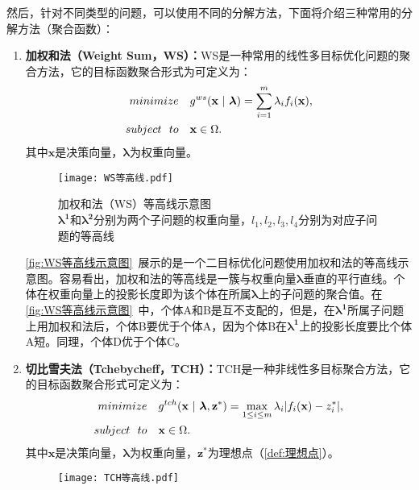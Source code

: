 然后，针对不同类型的问题，可以使用不同的分解方法，下面将介绍三种常用的分解方法（聚合函数）：
\par
\begin{enumerate}
    \item \textbf{加权和法（Weight Sum，WS）：}WS是一种常用的线性多目标优化问题的聚合方法\cite{hillermeier2001nonlinear}，它的目标函数聚合形式为可定义为：
    \begin{align}
        \label{eq:WS}
        minimize \quad & g^{ws}(\mathbf{x} \ | \ \boldsymbol{\lambda}) = \sum_{i=1}^m \lambda_i f_i(\mathbf{x}), \\
        subject \ \ to \quad & \mathbf{x} \in \Omega. \notag
    \end{align}
    其中$\mathbf{x}$是决策向量，$\boldsymbol{\lambda}$为权重向量。
    \begin{figure}[htb]
        \texttt{[image: WS等高线.pdf]}
        \caption[加权和法（WS）等高线示意图]{加权和法（WS）等高线示意图 \\ $\boldsymbol{\lambda^1}$和$\boldsymbol{\lambda^2}$分别为两个子问题的权重向量，$l_1, l_2, l_3, l_4$分别为对应子问题的等高线}
        \label{fig:WS等高线示意图}
    \end{figure}
    \par
    \autoref{fig:WS等高线示意图}~展示的是一个二目标优化问题使用加权和法的等高线示意图。容易看出，加权和法的等高线是一簇与权重向量$\boldsymbol{\lambda}$垂直的平行直线。个体在权重向量上的投影长度即为该个体在所属$\boldsymbol{\lambda}$上的子问题的聚合值。在\autoref{fig:WS等高线示意图}~中，个体A和B是互不支配的，但是，在$\boldsymbol{\lambda^1}$所属子问题上用加权和法后，个体B要优于个体A，因为个体B在$\boldsymbol{\lambda^1}$上的投影长度要比个体A短。同理，个体D优于个体C。
    \item \textbf{切比雪夫法（Tchebycheff，TCH）：}TCH是一种非线性多目标聚合方法\cite{jaszkiewicz2002performance}，它的目标函数聚合形式可定义为：
    \begin{align}
        \label{eq:TCH}
        minimize \quad & g^{tch}(\mathbf{x} \ | \ \boldsymbol{\lambda},\mathbf{z}^*) = \max_{1 \leq i \leq m} \lambda_i | f_i(\mathbf{x}) - z^*_i |, \\
        subject \ \ to \quad & \mathbf{x} \in \Omega. \notag
    \end{align}
    其中$\mathbf{x}$是决策向量，$\boldsymbol{\lambda}$为权重向量，$\mathbf{z}^*$为理想点（\autoref{def:理想点}）。
    \par
    \begin{figure}[htb]
        \texttt{[image: TCH等高线.pdf]}

\end{figure}
\end{enumerate}
